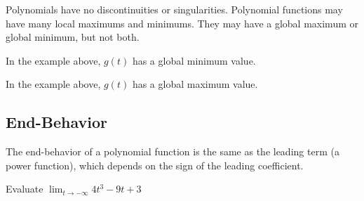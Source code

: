 \documentclass{ximera}
\begin{document}
Polynomials have no discontinuities or singularities.  Polynomial functions may have many local maximums and minimums. They may have a global maximum or global minimum, but not both.







\begin{question}

In the example above, $g(t)$ has a global minimum value.



\begin{multipleChoice}
\end{multipleChoice}

\end{question}



\begin{question}

In the example above, $g(t)$ has a global maximum value.



\begin{multipleChoice}
\end{multipleChoice}

\end{question}










\subsection{End-Behavior}


The end-behavior of a polynomial function is the same as the leading term (a power function), which depends on the sign of the leading coefficient.











\begin{question}

Evaluate $\lim_{t \to -\infty} 4 t^3 - 9 t + 3$


\begin{multipleChoice}
\choice [correct]{$-\infty$}
\choice {$\infty$}
\end{multipleChoice}

\end{question}
\end{document}
